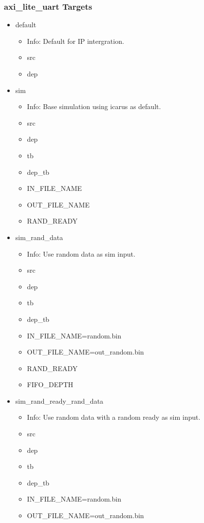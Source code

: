 \subsubsection{axi\_lite\_uart Targets}
\begin{itemize}
\item default
	\begin{itemize}
	\item[$\space$] Info: Default for IP intergration.
	\item src
	\item dep
	\end{itemize}
\item sim
	\begin{itemize}
	\item[$\space$] Info: Base simulation using icarus as default.
	\item src
	\item dep
	\item tb
	\item dep\_tb
	\item IN\_FILE\_NAME
	\item OUT\_FILE\_NAME
	\item RAND\_READY
	\end{itemize}
\item sim\_rand\_data
	\begin{itemize}
	\item[$\space$] Info: Use random data as sim input.
	\item src
	\item dep
	\item tb
	\item dep\_tb
	\item IN\_FILE\_NAME=random.bin
	\item OUT\_FILE\_NAME=out\_random.bin
	\item RAND\_READY
	\item FIFO\_DEPTH
	\end{itemize}
\item sim\_rand\_ready\_rand\_data
	\begin{itemize}
	\item[$\space$] Info: Use random data with a random ready as sim input.
	\item src
	\item dep
	\item tb
	\item dep\_tb
	\item IN\_FILE\_NAME=random.bin
	\item OUT\_FILE\_NAME=out\_random.bin

\end{itemize}
\end{itemize}
